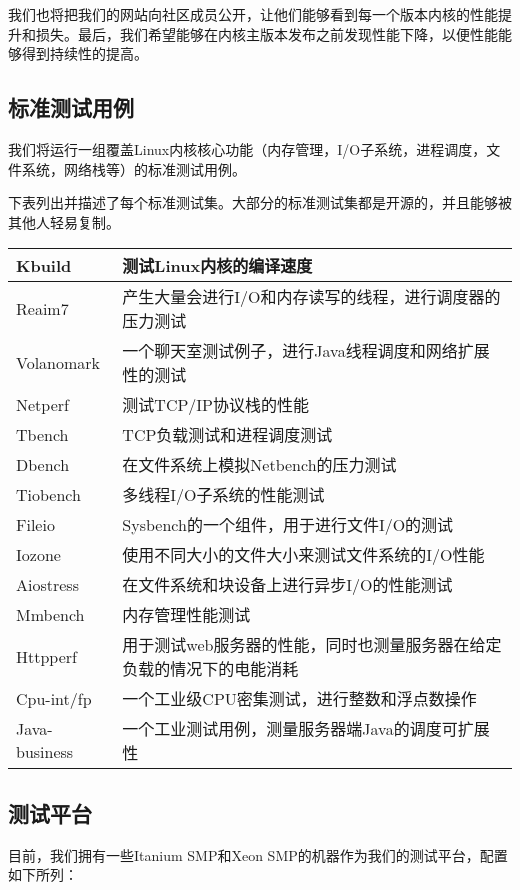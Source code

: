 我们也将把我们的网站向社区成员公开，让他们能够看到每一个版本内核的性能提升和损失。最后，我们希望能够在内核主版本发布之前发现性能下降，以便性能能够得到持续性的提高。
\subsection{标准测试用例}
我们将运行一组覆盖Linux内核核心功能（内存管理，I/O子系统，进程调度，文件系统，网络栈等）的标准测试用例。

下表列出并描述了每个标准测试集。大部分的标准测试集都是开源的，并且能够被其他人轻易复制。



\tabletail{\hline}

\begin{supertabular}{|p{2.5cm}|p{10.3cm}|}
\hline
Kbuild & 测试Linux内核的编译速度\\
\hline
Reaim7 & 产生大量会进行I/O和内存读写的线程，进行调度器的压力测试\\
\hline
Volanomark & 一个聊天室测试例子，进行Java线程调度和网络扩展性的测试\\
\hline 
Netperf & 测试TCP/IP协议栈的性能\\
\hline
Tbench & TCP负载测试和进程调度测试\\
\hline
Dbench & 在文件系统上模拟Netbench的压力测试\\
\hline
Tiobench & 多线程I/O子系统的性能测试\\
\hline
Fileio & Sysbench的一个组件，用于进行文件I/O的测试\\
\hline
Iozone & 使用不同大小的文件大小来测试文件系统的I/O性能\\
\hline
Aiostress & 在文件系统和块设备上进行异步I/O的性能测试\\
\hline
Mmbench & 内存管理性能测试\\
\hline
Httpperf & 用于测试web服务器的性能，同时也测量服务器在给定负载的情况下的电能消耗\\
\hline
Cpu-int/fp & 一个工业级CPU密集测试，进行整数和浮点数操作\\
\hline
Java-business & 一个工业测试用例，测量服务器端Java的调度可扩展性\\
\end{supertabular}


\subsection{测试平台}
目前，我们拥有一些Itanium SMP和Xeon SMP的机器作为我们的测试平台，配置如下所列：

